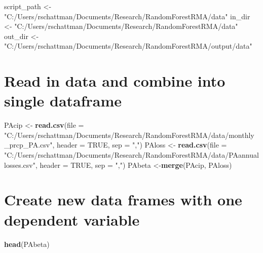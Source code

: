 \documentclass[]{article}
\newenvironment{Shaded}{\begin{snugshade}}{\end{snugshade}}
\newcommand{\KeywordTok}[1]{\textcolor[rgb]{0.13,0.29,0.53}{\textbf{{#1}}}}
\newcommand{\DataTypeTok}[1]{\textcolor[rgb]{0.13,0.29,0.53}{{#1}}}
\newcommand{\StringTok}[1]{\textcolor[rgb]{0.31,0.60,0.02}{{#1}}}
\newcommand{\OtherTok}[1]{\textcolor[rgb]{0.56,0.35,0.01}{{#1}}}
\newcommand{\NormalTok}[1]{{#1}}
\begin{document}
\begin{Shaded}
\begin{Highlighting}[]
\NormalTok{script_path <-}\StringTok{ "C:/Users/rschattman/Documents/Research/RandomForestRMA/data"}
\NormalTok{in_dir <-}\StringTok{ "C:/Users/rschattman/Documents/Research/RandomForestRMA/data"}
\NormalTok{out_dir <-}\StringTok{ "C:/Users/rschattman/Documents/Research/RandomForestRMA/output/data"}
\end{Highlighting}
\end{Shaded}

\section{Read in data and combine into single
dataframe}\label{read-in-data-and-combine-into-single-dataframe}

\begin{Shaded}
\begin{Highlighting}[]
\NormalTok{PAcip <-}\StringTok{ }\KeywordTok{read.csv}\NormalTok{(}\DataTypeTok{file =} \StringTok{"C:/Users/rschattman/Documents/Research/RandomForestRMA/data/monthly_prcp_PA.csv"}\NormalTok{, }\DataTypeTok{header =} \OtherTok{TRUE}\NormalTok{, }\DataTypeTok{sep =} \StringTok{","}\NormalTok{)}
\NormalTok{PAloss <-}\StringTok{ }\KeywordTok{read.csv}\NormalTok{(}\DataTypeTok{file =} \StringTok{"C:/Users/rschattman/Documents/Research/RandomForestRMA/data/PAannuallosses.csv"}\NormalTok{, }\DataTypeTok{header =} \OtherTok{TRUE}\NormalTok{, }\DataTypeTok{sep =} \StringTok{","}\NormalTok{)}
\NormalTok{PAbeta <-}\KeywordTok{merge}\NormalTok{(PAcip, PAloss)}
\end{Highlighting}
\end{Shaded}

\section{Create new data frames with one dependent
variable}\label{create-new-data-frames-with-one-dependent-variable}

\begin{Shaded}
\begin{Highlighting}[]
\KeywordTok{head}\NormalTok{(PAbeta)}
\end{Highlighting}
\end{Shaded}
\end{document}
